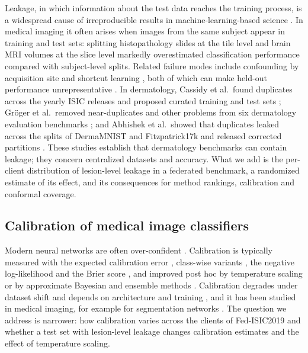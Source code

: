 Leakage, in which information about the test data reaches the training process, is a widespread cause
of irreproducible results in machine-learning-based science \cite{kapoor2023leakage}. In medical imaging
it often arises when images from the same subject appear in training and test sets: splitting
histopathology slides at the tile level \cite{bussola2021tiles} and brain MRI volumes at the slice level
\cite{yagis2021leakage} markedly overestimated classification performance compared with subject-level
splits. Related failure modes include confounding by acquisition site \cite{zech2018confounding} and shortcut
learning \cite{degrave2021shortcuts}, both of which
can make held-out performance unrepresentative \cite{roberts2021pitfalls,varoquaux2022failures}. In
dermatology, Cassidy et al.\ found duplicates across the yearly ISIC releases and proposed curated
training and test sets \cite{cassidy2022isic}; Gr\"oger et al.\ removed near-duplicates and other
problems from six dermatology evaluation benchmarks \cite{groger2023reliable}; and Abhishek et al.\ showed
that duplicates leaked across the splits of DermaMNIST and Fitzpatrick17k and released corrected
partitions \cite{abhishek2025dermamnist}. These studies establish that dermatology benchmarks can contain
leakage; they concern centralized datasets and accuracy. What we add is the per-client distribution of
lesion-level leakage in a federated benchmark, a randomized estimate of its effect, and its consequences
for method rankings, calibration and conformal coverage.

\subsection{Calibration of medical image classifiers}

Modern neural networks are often over-confident \cite{guo2017calibration}. Calibration is typically
measured with the expected calibration error \cite{naeini2015ece}, class-wise variants
\cite{kull2019beyond}, the negative log-likelihood and the Brier score \cite{brier1950}, and improved post
hoc by temperature scaling \cite{guo2017calibration} or by approximate Bayesian and ensemble methods
\cite{gal2016dropout}. Calibration degrades under dataset shift
\cite{ovadia2019trust} and depends on architecture and training \cite{minderer2021revisiting}, and it has
been studied in medical imaging, for example for segmentation networks \cite{mehrtash2020confidence}. The question we
address is narrower: how calibration varies across the clients of Fed-ISIC2019 and whether a test set with
lesion-level leakage changes calibration estimates and the effect of temperature scaling.

